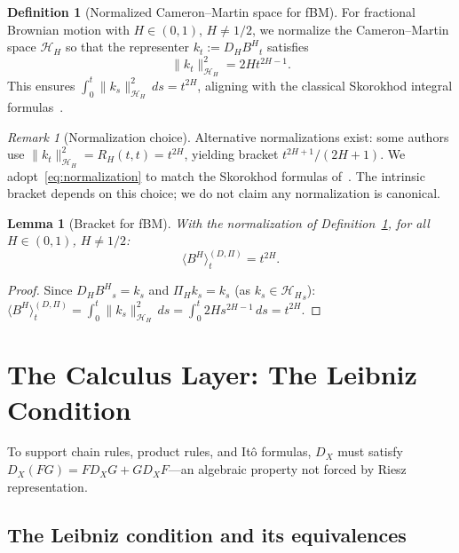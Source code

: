 \documentclass[11pt,a4paper]{article}
\theoremstyle{plain}
\newtheorem{lemma}[theorem]{Lemma}
\theoremstyle{definition}
\newtheorem{definition}[theorem]{Definition}
\theoremstyle{remark}
\newtheorem{remark}[theorem]{Remark}
\newcommand{\HH}{\mathcal{H}_H}
\newcommand{\BH}{B^H}
\begin{document}
\begin{definition}[Normalized Cameron--Martin space for fBM]\label{def:normalized_CM}
For fractional Brownian motion with $H \in (0,1)$, $H \neq 1/2$, we normalize the Cameron--Martin space $\HH$ so that the representer $k_t := D_H{\BH}_t$ satisfies
\begin{equation}\label{eq:normalization}
\|k_t\|^2_{\HH} = 2Ht^{2H-1}.
\end{equation}
This ensures $\int_0^t\|k_s\|^2_{\HH}\,ds = t^{2H}$, aligning with the classical Skorokhod integral formulas~\cite{Decreusefond1999,Nualart2006}.
\end{definition}

\begin{remark}[Normalization choice]\label{rem:normalization}
Alternative normalizations exist: some authors use $\|k_t\|^2_{\HH} = R_H(t,t) = t^{2H}$, yielding bracket $t^{2H+1}/(2H+1)$. We adopt~\eqref{eq:normalization} to match the Skorokhod formulas of~\cite{Decreusefond1999}. The intrinsic bracket depends on this choice; we do not claim any normalization is canonical.
\end{remark}

\begin{lemma}[Bracket for fBM]\label{lem:bracket_fbm}
With the normalization of Definition~\ref{def:normalized_CM}, for all $H \in (0,1)$, $H \neq 1/2$:
\[
\langle\BH\rangle_t^{(D,\Pi)} = t^{2H}.
\]
\end{lemma}

\begin{proof}
Since $D_H{\BH}_s = k_s$ and $\Pi_Hk_s = k_s$ (as $k_s \in {\HH}_s$):
$\langle\BH\rangle_t^{(D,\Pi)} = \int_0^t\|k_s\|^2_{\HH}\,ds = \int_0^t 2Hs^{2H-1}\,ds = t^{2H}$.
\end{proof}


\section{The Calculus Layer: The Leibniz Condition}\label{sec:leibniz}

To support chain rules, product rules, and It\^o formulas, $D_X$ must satisfy $D_X(FG) = FD_XG + GD_XF$---an algebraic property not forced by Riesz representation.

\subsection{The Leibniz condition and its equivalences}
\end{document}
